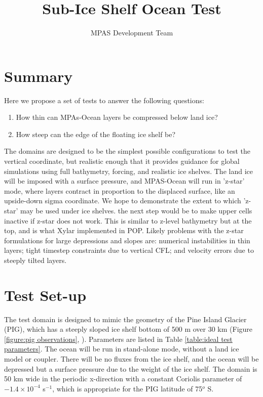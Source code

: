 \documentclass[11pt]{report}
\begin{document}
\title{
Sub-Ice Shelf Ocean Test
}
\author{MPAS Development Team}

\maketitle
\tableofcontents


\chapter{Summary}

Here we propose a set of tests to answer the following questions:
\begin{enumerate}
\item How thin can MPAs-Ocean layers be compressed below land ice?
\item How steep can the edge of the floating ice shelf be?
\end{enumerate}
The domains are designed to be the simplest possible configurations to test the vertical coordinate, but realistic enough that it provides guidance for global simulations using full bathymetry, forcing, and realistic ice shelves.    The land ice will be imposed with a surface pressure, and MPAS-Ocean will run in 'z-star' mode, where layers contract in proportion to the displaced surface, like an upside-down sigma coordinate.  We hope to demonstrate the extent to which 'z-star' may be used under ice shelves.  the next step would be to make upper cells inactive if z-star does not work.  This is similar to z-level bathymetry but at the top, and is what Xylar implemented in POP.  Likely problems with the z-star formulations for large depressions and slopes are: numerical instabilities in thin layers; tight timestep constraints due to vertical CFL; and velocity errors due to steeply tilted layers.


\chapter{Test Set-up}

The test domain is designed to mimic the geometry of the Pine Island Glacier (PIG), which has a steeply sloped ice shelf bottom of 500 m over 30 km (Figure \ref{figure:pig observations}, \citet{Jenkins_ea10ngeo}).  Parameters are listed in Table \ref{table:ideal test parameters}.  The ocean will be run in stand-alone mode, without a land ice model or coupler.  There will be no fluxes from the ice shelf, and the ocean will be depressed but a surface pressure due to the weight of the ice shelf.  The domain is 50 km wide in the periodic x-direction with a constant Coriolis parameter of $-1.4\times10^{-4}$ s$^{-1}$, which is appropriate for the PIG latitude of 75$^o$ S.
\end{document}
